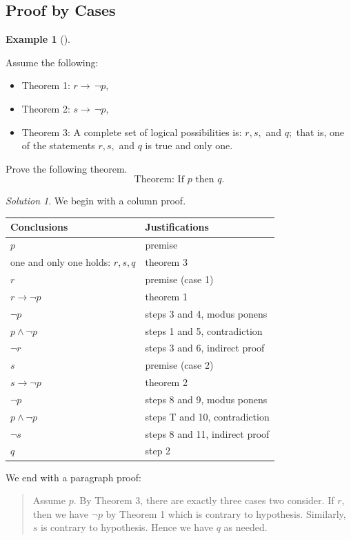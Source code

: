 \documentclass[
  letterpaper,
  10pt,
  reqno,
  twopage,
  openany]{book}
\providecommand{\tightlist}{%
  \setlength{\itemsep}{0pt}\setlength{\parskip}{0pt}}\usepackage{longtable,booktabs,array}
\theoremstyle{plain}
\theoremstyle{definition}
\theoremstyle{definition}
\theoremstyle{definition}
\newtheorem{example}{Example}[chapter]
\theoremstyle{plain}
\theoremstyle{plain}
\theoremstyle{remark}
\newtheorem*{solution}{Solution}
\begin{document}
\hypertarget{proof-by-cases}{%
\subsection{Proof by Cases}\label{proof-by-cases}}

\leavevmode{}%
\begin{example}[]\label{exm-proof-by-cases}

Assume the following:

\begin{itemize}
\tightlist
\item
  Theorem 1: \(r\rightarrow \, \neg p\),
\item
  Theorem 2: \(s\rightarrow \, \neg p\),
\item
  Theorem 3: A complete set of logical possibilities is: \(r, s,\) and
  \(q;\) that is, one of the statements \(r, s,\) and \(q\) is true and
  only one.
\end{itemize}

Prove the following theorem. \[
\text{Theorem: If $p$ then $q$.}
\]

\end{example}

\begin{solution}

We begin with a column proof.

\begin{longtable}[]{@{}ll@{}}
\toprule()
Conclusions & Justifications \\
\midrule()
\endhead
\(p\) & premise \\
one and only one holds: \(r, s, q\) & theorem 3 \\
\(r\) & premise (case 1) \\
\(r\rightarrow \neg p\) & theorem 1 \\
\(\neg p\) & steps 3 and 4, modus ponens \\
\(p \land \neg p\) & steps 1 and 5, contradiction \\
\(\neg r\) & steps 3 and 6, indirect proof \\
\(s\) & premise (case 2) \\
\(s\rightarrow \neg p\) & theorem 2 \\
\(\neg p\) & steps 8 and 9, modus ponens \\
\(p \land \neg p\) & steps T and 10, contradiction \\
\(\neg s\) & steps 8 and 11, indirect proof \\
\(q\) & step 2 \\
\bottomrule()
\end{longtable}

We end with a paragraph proof:

\begin{quote}
Assume \(p\). By Theorem 3, there are exactly three cases two consider.
If \(r\), then we have \(\neg p\) by Theorem 1 which is contrary to
hypothesis. Similarly, \(s\) is contrary to hypothesis. Hence we have
\(q\) as needed.
\end{quote}

\end{solution}
\end{document}

